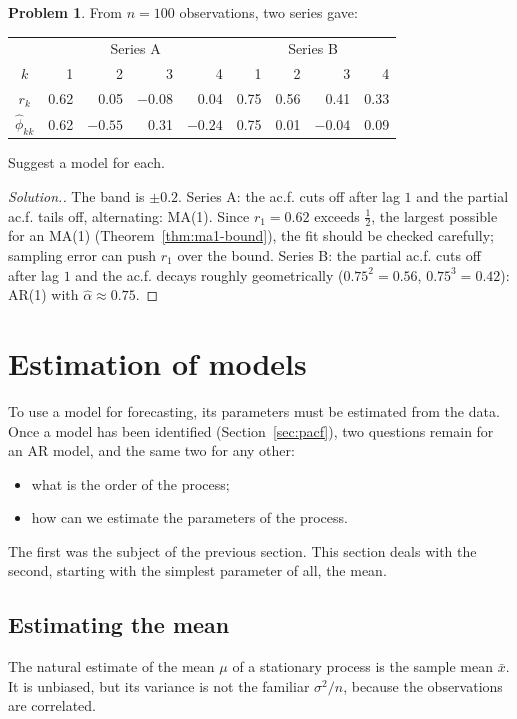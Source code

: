 \documentclass[11pt,a4paper]{article}
\theoremstyle{definition}
\newtheorem{problemx}{Problem}[subsection]
\newenvironment{problem}{\begin{problemx}}{\end{problemx}}
\newenvironment{solution}
  {\renewcommand{\qedsymbol}{}\begin{proof}[\textit{Solution}.]}
  {\end{proof}}
\begin{document}
\begin{problem}\label{prob:identify-tables}
From $n = 100$ observations, two series gave:
\begin{center}
\begin{tabular}{c|rrrr|rrrr}
& \multicolumn{4}{c|}{Series A} & \multicolumn{4}{c}{Series B} \\
$k$ & 1 & 2 & 3 & 4 & 1 & 2 & 3 & 4 \\
\hline
$r_k$ & 0.62 & 0.05 & $-0.08$ & 0.04 & 0.75 & 0.56 & 0.41 & 0.33 \\
$\hat\phi_{kk}$ & 0.62 & $-0.55$ & 0.31 & $-0.24$ & 0.75 & 0.01 & $-0.04$ & 0.09 \\
\end{tabular}
\end{center}
Suggest a model for each.
\end{problem}

\begin{solution}
The band is $\pm0.2$. Series A: the ac.f. cuts off after lag $1$ and the partial ac.f. tails off, alternating: MA(1). Since
$r_1 = 0.62$ exceeds $\frac12$, the largest possible for an MA(1) (Theorem~\ref{thm:ma1-bound}), the fit should be checked carefully; sampling
error can push $r_1$ over the bound. Series B: the partial ac.f. cuts off after lag $1$ and the ac.f. decays roughly geometrically
($0.75^2 = 0.56$, $0.75^3 = 0.42$): AR(1) with $\hat\alpha \approx 0.75$.
\end{solution}

\section{Estimation of models}\label{sec:estimation}
To use a model for forecasting, its parameters must be estimated from the data. Once a model has been
identified (Section~\ref{sec:pacf}), two questions remain for an AR model, and the same two for any other:
\begin{itemize}
\item what is the order of the process;
\item how can we estimate the parameters of the process.
\end{itemize}
The first was the subject of the previous section. This section deals with the second, starting with the
simplest parameter of all, the mean.

\subsection{Estimating the mean}
The natural estimate of the mean $\mu$ of a stationary process is the sample mean $\bar x$. It is unbiased, but its variance is
not the familiar $\sigma^2/n$, because the observations are correlated.
\end{document}
